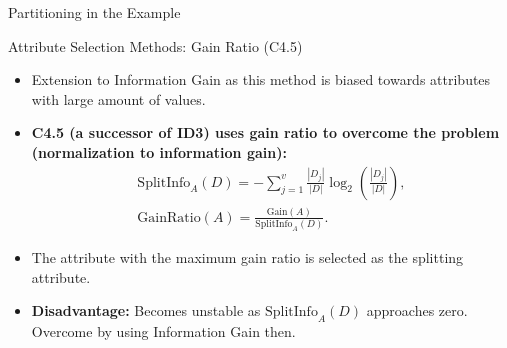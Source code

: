\begin{frame}{Partitioning in the Example}
\end{frame}

\begin{frame}{Attribute Selection Methods: Gain Ratio (C4.5)}
	\begin{itemize}
		\item Extension to Information Gain as this method is biased towards attributes with large amount of values.
		\item \textbf{C4.5 (a successor of ID3) uses gain ratio to overcome the problem (normalization to information gain):}
		      \begin{align*}
			      \text{SplitInfo}_A(D) = - \sum_{j=1}^{v} \frac{|D_j|}{|D|} \log_2\left( \frac{|D_j|}{|D|} \right), \\
			      \text{GainRatio}(A) = \frac{\text{Gain}(A)}{\text{SplitInfo}_A(D)}.
		      \end{align*}

		\item The attribute with the maximum gain ratio is selected as the splitting attribute.
		\item \textbf{Disadvantage:} Becomes unstable as $\text{SplitInfo}_A(D)$
		      approaches zero. Overcome by using Information Gain then.
	\end{itemize}
\end{frame}

